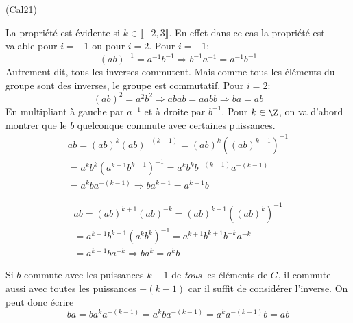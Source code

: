 \begin{tiny}(Cal21)\end{tiny} La propriété est évidente si $k\in \llbracket -2, 3\rrbracket$. En effet dans ce cas la propriété est valable pour $i=-1$ ou pour $i=2$.
Pour $i= -1$:
\begin{displaymath}
  (ab)^{-1} = a^{-1}b^{-1}\Rightarrow b^{-1}a^{-1} = a^{-1}b^{-1}
\end{displaymath}
Autrement dit, tous les inverses commutent. Mais comme tous les éléments du groupe sont des inverses, le groupe est commutatif.\newline
Pour $i=2$:
\begin{displaymath}
  (ab)^{2} = a^2 b^2 \Rightarrow abab = aabb\Rightarrow ba = ab
\end{displaymath}
En multipliant à gauche par $a^{-1}$ et à droite par $b^{-1}$.\newline
Pour $k\in \Z$, on va d'abord montrer que le $b$ quelconque commute avec certaines puissances.
\begin{multline*}
ab = (ab)^{k}(ab)^{-(k-1)} 
= (ab)^{k} ((ab)^{k-1})^{-1}\\
= a^k b^k (a^{k-1}b^{k-1})^{-1} 
= a^{k} b^{k} b^{-(k-1)} a^{-(k-1)}\\
= a^{k} b a^{-(k-1)}
\Rightarrow b a^{k-1} = a^{k-1} b 
\end{multline*}

\begin{multline*}
ab = (ab)^{k+1}(ab)^{-k} 
= (ab)^{k+1} ((ab)^{k})^{-1}\\
= a^{k+1} b^{k+1} (a^{k}b^{k})^{-1} 
= a^{k+1} b^{k+1} b^{-k} a^{-k}\\
= a^{k+1} b a^{-k}
\Rightarrow b a^{k} = a^{k} b 
\end{multline*}

Si $b$ commute avec les puissances $k-1$ de  \emph{tous} les éléments de $G$, il commute aussi avec toutes les puissances $-(k-1)$ car il suffit de considérer l'inverse. On peut donc écrire
\begin{displaymath}
  ba = ba^k a^{-(k-1)} = a^k b a^{-(k-1)} = a^k a^{-(k-1)}b = ab 
\end{displaymath}
